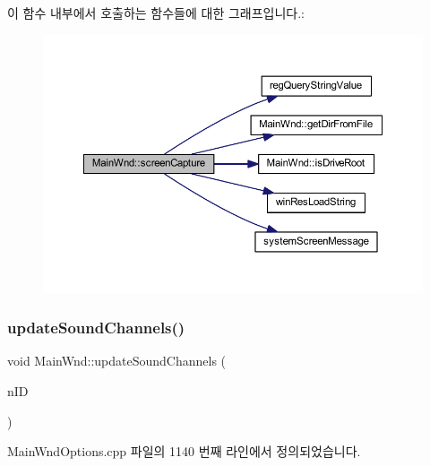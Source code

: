 이 함수 내부에서 호출하는 함수들에 대한 그래프입니다.\+:
\nopagebreak
\begin{figure}[H]
\begin{center}
\leavevmode
\includegraphics[width=350pt]{class_main_wnd_aea243ed57e88a9efec1196d510d6b235_cgraph}
\end{center}
\end{figure}
\mbox{\label{class_main_wnd_a30b67d9db53d79122684a81e549ebd1c}} 
\subsubsection{\texorpdfstring{update\+Sound\+Channels()}{updateSoundChannels()}}
{\footnotesize\ttfamily void Main\+Wnd\+::update\+Sound\+Channels (\begin{DoxyParamCaption}\item[{U\+I\+NT}]{n\+ID }\end{DoxyParamCaption})}



Main\+Wnd\+Options.\+cpp 파일의 1140 번째 라인에서 정의되었습니다.


